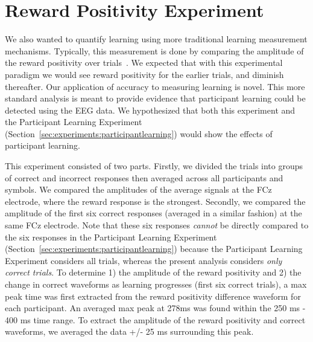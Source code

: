 \section{Reward Positivity Experiment}
\label{sec:experiments:rewpos}
We also wanted to quantify learning using more traditional learning measurement mechanisms. Typically, this measurement is done by comparing the amplitude of the reward positivity over trials~\cite{williams2017application}. We expected that with this experimental paradigm we would see reward positivity for the earlier trials, and diminish thereafter. Our application of \tvt accuracy to measuring learning is novel.  This more standard analysis is meant to provide evidence that participant learning could be detected using the EEG data. We hypothesized that both this experiment and the Participant Learning Experiment (Section~\ref{sec:experiments:participantlearning}) would show the effects of participant learning.

This experiment consisted of two parts. Firstly, we divided the trials into groups of correct and incorrect responses then averaged across all participants and symbols. We compared the amplitudes of the average signals at the FCz electrode, where the reward response is the strongest. Secondly, we compared the amplitude of the first six correct responses (averaged in a similar fashion) at the same FCz electrode. Note that these six responses \emph{cannot} be directly compared to the six responses in the Participant Learning Experiment (Section~\ref{sec:experiments:participantlearning}) because the Participant Learning Experiment considers all trials, whereas the present analysis considers \emph{only correct trials}. To determine 1) the amplitude of the reward positivity and 2) the change in correct waveforms as learning progresses (first six correct trials), a max peak time was first extracted from the reward positivity difference waveform for each participant. An averaged max peak at 278ms was found within the 250 ms - 400 ms time range. To extract the amplitude of the reward positivity and correct waveforms, we  averaged the data +/- 25 ms surrounding this peak.
